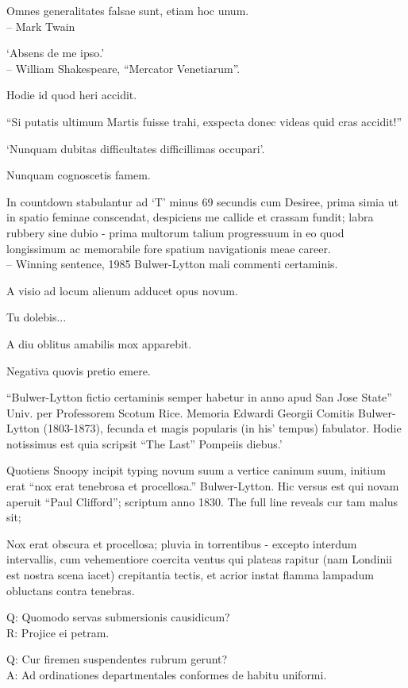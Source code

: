 \documentclass[titlepage,12pt]{memoir}
\begin{document}
Omnes generalitates falsae sunt, etiam hoc unum.
\\-- Mark Twain

‘Absens de me ipso.’
\\-- William Shakespeare, “Mercator Venetiarum”.

Hodie id quod heri accidit.

“Si putatis ultimum Martis fuisse trahi, exspecta donec videas quid cras accidit!”

‘Nunquam dubitas difficultates difficillimas occupari’.

Nunquam cognoscetis famem.

In countdown stabulantur ad ‘T’ minus 69 secundis cum Desiree, prima
simia ut in spatio feminae conscendat, despiciens me callide et crassam fundit;
labra rubbery sine dubio - prima multorum talium progressuum in eo quod
longissimum ac memorabile fore spatium navigationis meae
career.
\\-- Winning sentence, 1985 Bulwer-Lytton mali commenti certaminis.

A visio ad locum alienum adducet opus novum.

Tu dolebis...

A diu oblitus amabilis mox apparebit.

Negativa quovis pretio emere.

“Bulwer-Lytton fictio certaminis semper habetur in anno apud San Jose State”
Univ. per Professorem Scotum Rice. Memoria Edwardi Georgii
Comitis Bulwer-Lytton (1803-1873), fecunda et magis popularis (in his’
tempus) fabulator. Hodie notissimus est quia scripsit “The Last”
Pompeiis diebus.’

Quotiens Snoopy incipit typing novum suum a vertice caninum suum,
initium erat “nox erat tenebrosa et procellosa.”
Bulwer-Lytton. Hic versus est qui novam aperuit “Paul Clifford”;
scriptum anno 1830. The full line reveals cur tam malus sit;

Nox erat obscura et procellosa; pluvia in torrentibus - excepto
interdum intervallis, cum vehementiore coercita
ventus qui plateas rapitur (nam Londinii est nostra scena
iacet) crepitantia tectis, et acrior instat
flamma lampadum obluctans contra tenebras.

Q: Quomodo servas submersionis causidicum?\\
R: Projice ei petram.

Q: Cur firemen suspendentes rubrum gerunt?\\
A: Ad ordinationes departmentales conformes de habitu uniformi.
\end{document}
